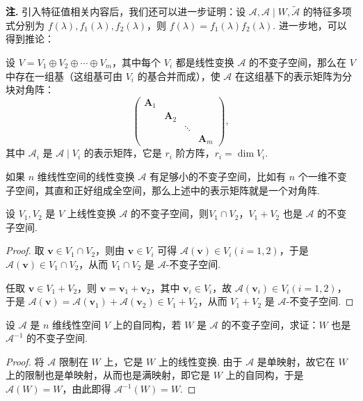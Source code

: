 \documentclass[12pt, a4paper,newtx]{ctexart}
\newenvironment{remark}{\dbend\textbf{注. }}{}{}
\begin{document}
\begin{remark}
	引入特征值相关内容后，我们还可以进一步证明：设 $\mathcal{A}, \mathcal{A}\mid W, \tilde{\mathcal{A}}$ 的特征多项式分别为 $f(\lambda), f_1(\lambda), f_2(\lambda)$，则 $f(\lambda) = f_1(\lambda) f_2(\lambda)$. 
\end{remark}
进一步地，可以得到推论：
\begin{corollary}{}{}
	设 $V = V_1 \oplus V_2 \oplus \cdots \oplus V_m$，其中每个 $V_i$ 都是线性变换 $\mathcal{A}$ 的不变子空间，那么在 $V$ 中存在一组基（这组基可由 $V_i$ 的基合并而成），使 $\mathcal{A}$ 在这组基下的表示矩阵为分块对角阵：
	\[
	\begin{pmatrix}
		\bm{A}_1 & & & \\
		& \bm{A}_2 & & \\
		& & \ddots & \\
		& & & \bm{A}_m
	\end{pmatrix},
	\]
	其中 $\mathcal{A}_i$ 是 $\mathcal{A}\mid {V_i}$ 的表示矩阵，它是 $r_i$ 阶方阵，$r_i = \dim V_i$. 
\end{corollary}
如果 $n$ 维线性空间的线性变换 $\mathcal{A}$ 有足够小的不变子空间，比如有 $n$ 个一维不变子空间，其直和正好组成全空间，那么上述中的表示矩阵就是一个对角阵. 
\begin{example}{}{}
	设 $V_1, V_2$ 是 $V$ 上线性变换 $\mathcal{A}$ 的不变子空间，则$V_1 \cap V_2$，$V_1 + V_2$ 也是 $\mathcal{A}$ 的不变子空间. 
\end{example}
\begin{proof}
	取 $\bm{v} \in V_1 \cap V_2$，则由 $\bm{v} \in V_i$ 可得 $\mathcal{A}(\bm{v}) \in V_i (i = 1,2)$，于是 $\mathcal{A}(\bm{v}) \in V_1 \cap V_2$，从而 $V_1 \cap V_2$ 是 $\mathcal{A}$-不变子空间. 
	
	任取 $\bm{v} \in V_1 + V_2$，则 $\bm{v} = \bm{v}_1 + \bm{v}_2$，其中 $\bm{v}_i \in V_i$，故 $\mathcal{A}(\bm{v}_i) \in V_i (i = 1,2)$，于是 $\mathcal{A}(\bm{v}) = \mathcal{A}(\bm{v}_1) + \mathcal{A}(\bm{v}_2) \in V_1 + V_2$，从而 $V_1 + V_2$ 是 $\mathcal{A}$-不变子空间. 
\end{proof}
\begin{example}{}{}
	设 $\mathcal{A}$ 是 $n$ 维线性空间 $V$ 上的自同构，若 $W$ 是 $\mathcal{A}$ 的不变子空间，求证：$W$ 也是 $\mathcal{A}^{-1}$ 的不变子空间. 
\end{example}
\begin{proof}
	将 $\mathcal{A}$ 限制在 $W$ 上，它是 $W$ 上的线性变换. 由于 $\mathcal{A}$ 是单映射，故它在 $W$ 上的限制也是单映射，从而也是满映射，即它是 $W$ 上的自同构，于是 $\mathcal{A}(W) = W$，由此即得 $\mathcal{A}^{-1}(W) = W$. 
\end{proof}
\end{document}
